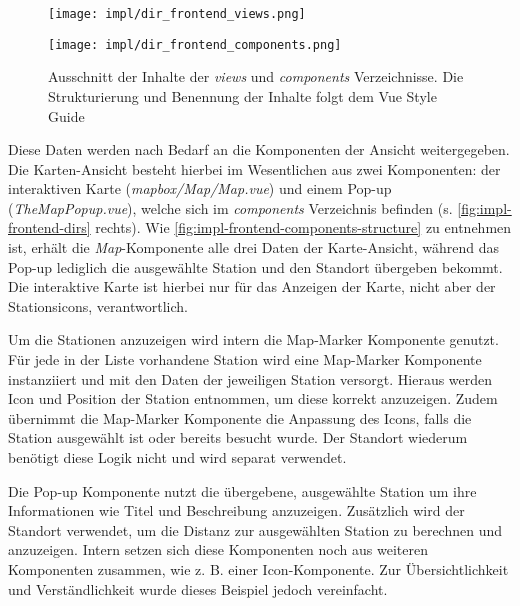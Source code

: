\begin{figure}[htpb]
    \centering
    \begin{minipage}{.5\textwidth}
        \centering
        \texttt{[image: impl/dir\_frontend\_views.png]}
    \end{minipage}%
    \begin{minipage}{.5\textwidth}
        \centering
        \texttt{[image: impl/dir\_frontend\_components.png]}
    \end{minipage}
    \caption{Ausschnitt der Inhalte der \textit{views} und \textit{components}
    Verzeichnisse. Die Strukturierung und Benennung der Inhalte folgt dem Vue
    Style Guide \cite{You2022b}}
    \label{fig:impl-frontend-dirs}
\end{figure}

Diese Daten werden nach Bedarf an die Komponenten der Ansicht weitergegeben. Die
Karten-Ansicht besteht hierbei im Wesentlichen aus zwei Komponenten: der
interaktiven Karte (\textit{mapbox/Map/Map.vue}) und einem Pop-up
(\textit{TheMapPopup.vue}), welche sich im \textit{components} Verzeichnis
befinden (s. \autoref{fig:impl-frontend-dirs} rechts). Wie
\autoref{fig:impl-frontend-components-structure} zu entnehmen ist, erhält die
\textit{Map}-Komponente alle drei Daten der Karte-Ansicht, während das Pop-up
lediglich die ausgewählte Station und den Standort übergeben bekommt. Die
interaktive Karte ist hierbei nur für das Anzeigen der Karte, nicht aber der
Stationsicons, verantwortlich.

Um die Stationen anzuzeigen wird intern die Map-Marker Komponente genutzt. Für
jede in der Liste vorhandene Station wird eine Map-Marker Komponente
instanziiert und mit den Daten der jeweiligen Station versorgt. Hieraus werden
Icon und Position der Station entnommen, um diese korrekt anzuzeigen. Zudem
übernimmt die Map-Marker Komponente die Anpassung des Icons, falls die Station
ausgewählt ist oder bereits besucht wurde. Der Standort wiederum benötigt diese
Logik nicht und wird separat verwendet.

Die Pop-up Komponente nutzt die übergebene, ausgewählte Station um ihre
Informationen wie Titel und Beschreibung anzuzeigen. Zusätzlich wird der
Standort verwendet, um die Distanz zur ausgewählten Station zu berechnen und
anzuzeigen. Intern setzen sich diese Komponenten noch aus weiteren Komponenten
zusammen, wie z. B. einer Icon-Komponente. Zur Übersichtlichkeit und
Verständlichkeit wurde dieses Beispiel jedoch vereinfacht.

